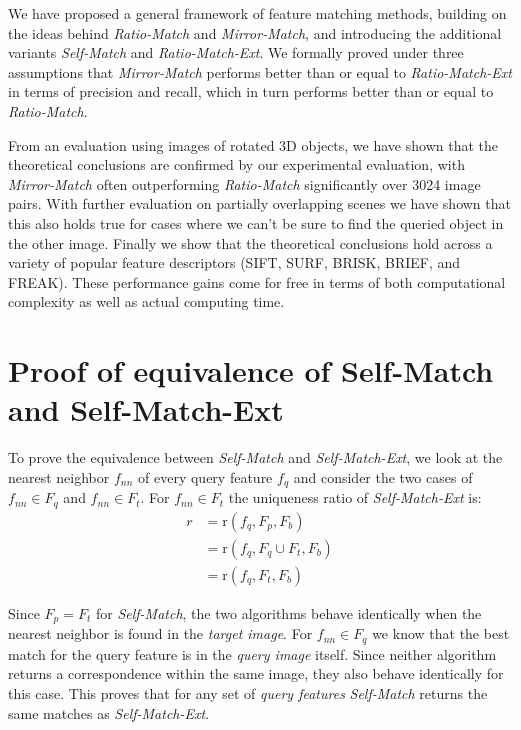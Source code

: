 \documentclass[review]{elsarticle}
\begin{document}
We have proposed a general framework of feature matching methods, building on the ideas behind \emph{Ratio-Match} and \emph{Mirror-Match}, and introducing the additional variants \emph{Self-Match} and \emph{Ratio-Match-Ext}. We formally proved under three assumptions that \emph{Mirror-Match} performs better than or equal to \emph{Ratio-Match-Ext} in terms of precision and recall, which in turn performs better than or equal to \emph{Ratio-Match}.

From an evaluation using images of rotated 3D objects, we have shown that the theoretical conclusions are confirmed by our experimental evaluation, with \emph{Mirror-Match} often outperforming \emph{Ratio-Match} significantly over 3024 image pairs. With further evaluation on partially overlapping scenes we have shown that this also holds true for cases where we can't be sure to find the queried object in the other image. Finally we show that the theoretical conclusions hold across a variety of popular feature descriptors (SIFT, SURF, BRISK, BRIEF, and FREAK). These performance gains come for free in terms of both computational complexity as well as actual computing time.

\appendix

\section{Proof of equivalence of Self-Match and Self-Match-Ext}
\label{A:self}

To prove the equivalence between \emph{Self-Match} and \emph{Self-Match-Ext}, we look at the nearest neighbor $f_{nn}$ of every query feature $f_{q}$ and consider the two cases of $f_{nn} \in F_{q}$ and $f_{nn} \in F_{t}$. For $f_{nn} \in F_{t}$ the uniqueness ratio of \emph{Self-Match-Ext} is:
\begin{align*}
    r &= \text{r}(f_{q}, F_{p}, F_{b}) \\
        &= \text{r}(f_{q}, F_{q} \cup F_{t}, F_{b})\\
        &= \text{r}(f_{q}, F_{t}, F_{b})
\end{align*}

Since $F_{p} = F_{t}$ for \emph{Self-Match}, the two algorithms behave identically when the nearest neighbor is found in the \emph{target image}. For $f_{nn} \in F_{q}$ we know that the best match for the query feature is in the \emph{query image} itself. Since neither algorithm returns a correspondence within the same image, they also behave identically for this case. This proves that for any set of \emph{query features} \emph{Self-Match} returns the same matches as \emph{Self-Match-Ext}.
\end{document}
